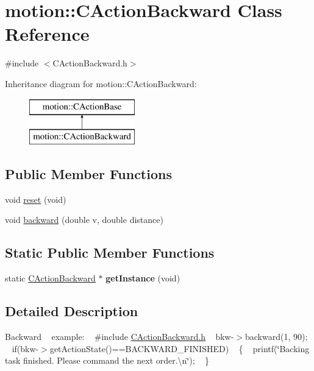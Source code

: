 \hypertarget{classmotion_1_1CActionBackward}{}\section{motion\+:\+:C\+Action\+Backward Class Reference}
\label{classmotion_1_1CActionBackward}


{\ttfamily \#include $<$C\+Action\+Backward.\+h$>$}

Inheritance diagram for motion\+:\+:C\+Action\+Backward\+:\begin{figure}[H]
\begin{center}
\leavevmode
\includegraphics[height=2.000000cm]{classmotion_1_1CActionBackward}
\end{center}
\end{figure}
\subsection*{Public Member Functions}
\begin{DoxyCompactItemize}
\item 
void \mbox{\hyperlink{classmotion_1_1CActionBackward_a609f364c24b4ceebda81c0b591692d2a}{reset}} (void)
\item 
void \mbox{\hyperlink{classmotion_1_1CActionBackward_ab05c93abef4815a4a9f38afeddbb8c2a}{backward}} (double v, double distance)
\end{DoxyCompactItemize}
\subsection*{Static Public Member Functions}
\begin{DoxyCompactItemize}
\item 
\mbox{\label{classmotion_1_1CActionBackward_aa1b0a2ac1a8f390bc88b36607137b5f1}} 
static \mbox{\hyperlink{classmotion_1_1CActionBackward}{C\+Action\+Backward}} $\ast$ {\bfseries get\+Instance} (void)
\end{DoxyCompactItemize}


\subsection{Detailed Description}
Backward ~\newline
 example\+: ~\newline
 \#include \mbox{\hyperlink{CActionBackward_8h}{C\+Action\+Backward.\+h}} ~\newline
 bkw-\/$>$backward(1, 90); ~\newline
if(bkw-\/$>$get\+Action\+State()==B\+A\+C\+K\+W\+A\+R\+D\+\_\+\+F\+I\+N\+I\+S\+H\+ED) ~\newline
\{ ~\newline
 printf(\char`\"{}\+Backing task finished. Please command the next order.\textbackslash{}n\char`\"{}); ~\newline
\} 

